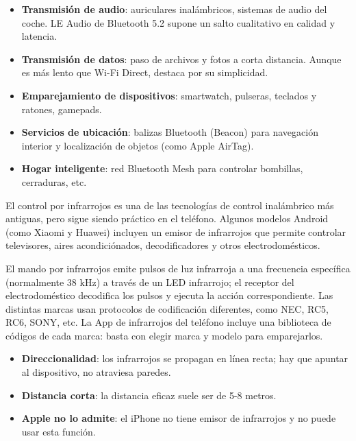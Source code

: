 \begin{itemize}
  \item \textbf{Transmisión de audio}: auriculares inalámbricos, sistemas de audio del coche. LE Audio de Bluetooth 5.2 supone un salto cualitativo en calidad y latencia.
  \item \textbf{Transmisión de datos}: paso de archivos y fotos a corta distancia. Aunque es más lento que Wi-Fi Direct, destaca por su simplicidad.
  \item \textbf{Emparejamiento de dispositivos}: smartwatch, pulseras, teclados y ratones, gamepads.
  \item \textbf{Servicios de ubicación}: balizas Bluetooth (Beacon) para navegación interior y localización de objetos (como Apple AirTag).
  \item \textbf{Hogar inteligente}: red Bluetooth Mesh para controlar bombillas, cerraduras, etc.
\end{itemize}


El control por infrarrojos es una de las tecnologías de control inalámbrico más antiguas, pero sigue siendo práctico en el teléfono. Algunos modelos Android (como Xiaomi y Huawei) incluyen un emisor de infrarrojos que permite controlar televisores, aires acondiciónados, decodificadores y otros electrodomésticos.


El mando por infrarrojos emite pulsos de luz infrarroja a una frecuencia específica (normalmente 38 kHz) a través de un LED infrarrojo; el receptor del electrodoméstico decodifica los pulsos y ejecuta la acción correspondiente. Las distintas marcas usan protocolos de codificación diferentes, como NEC, RC5, RC6, SONY, etc. La App de infrarrojos del teléfono incluye una biblioteca de códigos de cada marca: basta con elegir marca y modelo para emparejarlos.


\begin{itemize}
  \item \textbf{Direccionalidad}: los infrarrojos se propagan en línea recta; hay que apuntar al dispositivo, no atraviesa paredes.
  \item \textbf{Distancia corta}: la distancia eficaz suele ser de 5-8 metros.
  \item \textbf{Apple no lo admite}: el iPhone no tiene emisor de infrarrojos y no puede usar esta función.
\end{itemize}

